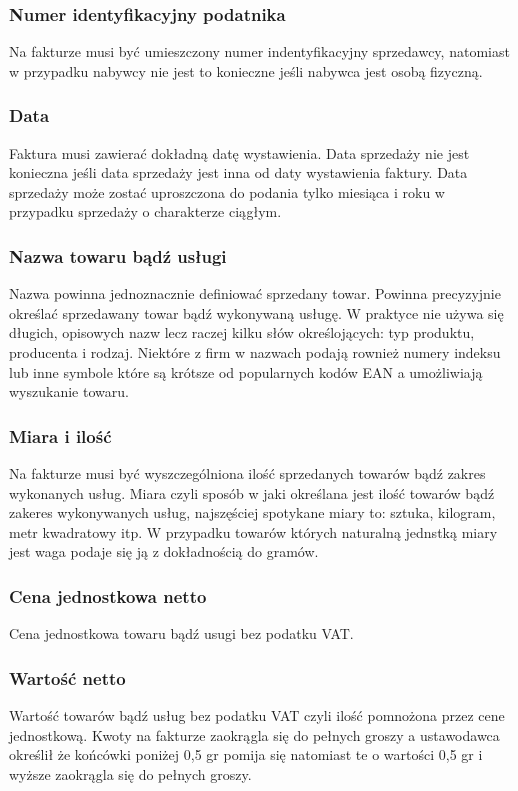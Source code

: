 \subsubsection{Numer identyfikacyjny podatnika}
Na fakturze musi być umieszczony numer indentyfikacyjny sprzedawcy, natomiast w
przypadku nabywcy nie jest to konieczne jeśli nabywca jest osobą fizyczną.
\subsubsection{Data}
Faktura musi zawierać dokładną datę wystawienia. Data sprzedaży nie jest
konieczna jeśli data sprzedaży jest inna od daty wystawienia faktury. Data
sprzedaży może zostać uproszczona do podania tylko miesiąca i roku w przypadku
sprzedaży o charakterze ciągłym.
\subsubsection{Nazwa towaru bądź usługi}
Nazwa powinna jednoznacznie definiować sprzedany towar. Powinna precyzyjnie
określać sprzedawany towar bądź wykonywaną usługę. W praktyce nie używa się
długich, opisowych nazw lecz raczej kilku słów określojących: typ produktu,
producenta i rodzaj. Niektóre z firm w nazwach podają rownież numery indeksu lub
inne symbole które są krótsze od popularnych kodów EAN a umożliwiają wyszukanie
towaru.
\subsubsection{Miara i ilość}
Na fakturze musi być wyszczególniona ilość sprzedanych towarów bądź zakres
wykonanych usług. Miara czyli sposób w jaki określana jest ilość towarów bądź
zakeres wykonywanych usług, najszęściej spotykane miary to: sztuka, kilogram,
metr kwadratowy itp. W przypadku towarów których naturalną jednstką miary jest
waga podaje się ją z dokładnością do gramów.
\subsubsection{Cena jednostkowa netto}
Cena jednostkowa towaru bądź usugi bez podatku VAT.
\subsubsection{Wartość netto}
Wartość towarów bądź usług bez podatku VAT czyli ilość pomnożona przez cene
jednostkową. Kwoty na fakturze zaokrągla się do pełnych groszy a ustawodawca
określił że końcówki poniżej 0,5 gr pomija się natomiast te o wartości 0,5 gr i
wyższe zaokrągla się do pełnych groszy.
